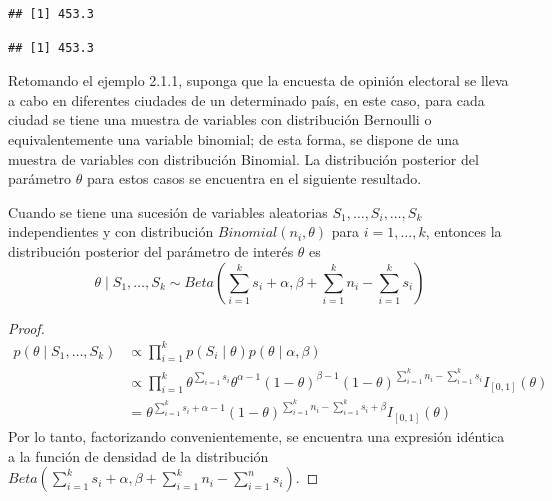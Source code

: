 \begin{knitrout}
\color{fgcolor}\begin{kframe}
\begin{alltt}
\hlopt{*}\hlstd{(}\hlopt{:}
\end{alltt}
\begin{verbatim}
## [1] 453.3
\end{verbatim}
\begin{alltt}
\hlopt{*}\hlopt{+}\hlopt{/}\hlopt{+}\hlopt{+}
\end{alltt}
\begin{verbatim}
## [1] 453.3
\end{verbatim}
\end{kframe}
\end{knitrout}
    
    Retomando el ejemplo 2.1.1, suponga que la encuesta de opini\'on electoral se lleva a cabo en diferentes ciudades de un determinado pa\'is, en este caso, para cada ciudad se tiene una muestra de variables con distribuci\'on Bernoulli o equivalentemente una variable binomial; de esta forma, se dispone de una muestra de variables con distribuci\'on Binomial. La distribuci\'on posterior del par\'ametro $\theta$ para estos casos se encuentra en el siguiente resultado.
    
    \begin{Res}
    Cuando se tiene una sucesi\'on de variables aleatorias $S_1,\ldots,S_i, \ldots,S_k$ independientes y con distribuci\'on $Binomial(n_i,\theta)$ para $i=1,\ldots,k$, entonces la distribuci\'on posterior del par\'ametro de inter\'es $\theta$ es
    \begin{equation*}
    \theta \mid S_1,\ldots,S_k \sim Beta\left(\sum_{i=1}^ks_i+\alpha,\beta+\sum_{i=1}^k n_i-\sum_{i=1}^k s_i\right)
    \end{equation*}
    \end{Res}
    
    \begin{proof}
    \begin{align*}
    p(\theta \mid S_1,\ldots,S_k)&\propto \prod_{i=1}^kp(S_i \mid \theta)p(\theta \mid \alpha,\beta)\\
    &\propto \prod_{i=1}^k\theta^{\sum_{i=1}s_i}\theta^{\alpha-1}(1-\theta)^{\beta-1}
    (1-\theta)^{\sum_{i=1}^kn_i-\sum_{i=1}^ks_i}I_{[0,1]}(\theta)\\
    &= \theta^{\sum_{i=1}^ks_i+\alpha-1}(1-\theta)^{\sum_{i=1}^kn_i-\sum_{i=1}^ks_i+\beta}I_{[0,1]}(\theta)
    \end{align*}
    Por lo tanto, factorizando convenientemente, se encuentra una expresi\'on id\'entica a la funci\'on de densidad de la distribuci\'on $Beta\left(\sum_{i=1}^ks_i+\alpha,\beta+\sum_{i=1}^k n_i-\sum_{i=1}^n s_i\right)$.
    \end{proof}
    

